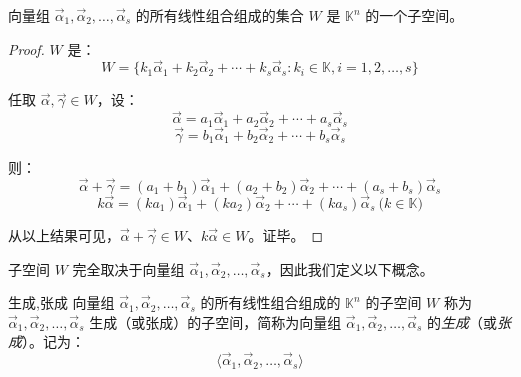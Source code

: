 \begin{theorem}
	向量组 $\vec \alpha_1, \vec \alpha_2, \ldots, \vec \alpha_s$ 的所有线性组合组成的集合 $W$ 是 $\mathbb K^n$ 的一个子空间。
\end{theorem}

\begin{proof}
	$W$ 是：
	$$
	W = \{ k_1 \vec \alpha_1 + k_2 \vec \alpha_2 + \cdots + k_s \vec \alpha_s: k_i \in \mathbb K, i = 1, 2, \ldots, s \}
	$$

	任取 $\vec \alpha, \vec \gamma \in W$，设：
	$$
	\vec \alpha = a_1 \vec \alpha_1 + a_2 \vec \alpha_2 + \cdots + a_s \vec \alpha_s
	$$$$
	\vec \gamma = b_1 \vec \alpha_1 + b_2 \vec \alpha_2 + \cdots + b_s \vec \alpha_s
	$$

	则：
	$$
	\vec \alpha + \vec \gamma = (a_1 + b_1) \vec \alpha_1 + (a_2 + b_2) \vec \alpha_2 + \cdots + (a_s + b_s) \vec \alpha_s
	$$$$
	k \vec \alpha = (k a_1) \vec \alpha_1 + (k a_2) \vec \alpha_2 + \cdots + (k a_s) \vec \alpha_s \pod{k \in \mathbb K}
	$$

	从以上结果可见，$\vec \alpha + \vec \gamma \in W$、$k \vec \alpha \in W$。证毕。
\end{proof}

子空间 $W$ 完全取决于向量组 $\vec \alpha_1, \vec \alpha_2, \ldots, \vec \alpha_s$，因此我们定义以下概念。

\begin{definition}{生成,张成}
	向量组 $\vec \alpha_1, \vec \alpha_2, \ldots, \vec \alpha_s$ 的所有线性组合组成的 $\mathbb K^n$ 的子空间 $W$ 称为 $\vec \alpha_1, \vec \alpha_2, \ldots, \vec \alpha_s$ 生成（或张成）的子空间，简称为向量组 $\vec \alpha_1, \vec \alpha_2, \ldots, \vec \alpha_s$ 的\emph{生成}（或\emph{张成}）。记为：
	$$
	\langle \vec \alpha_1, \vec \alpha_2, \ldots, \vec \alpha_s \rangle
	$$
\end{definition}